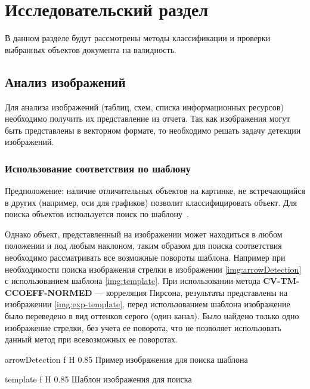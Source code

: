 \chapter{Исследовательский раздел}
В данном разделе будут рассмотрены методы классификации и проверки выбранных объектов документа на валидность.

\section{Анализ изображений}
Для анализа изображений (таблиц, схем, списка информационных ресурсов) необходимо получить их представление из отчета. Так как изображения могут быть представлены
в векторном формате, то необходимо решать задачу детекции изображений. 	



\subsection{Использование соответствия по шаблону}
Предположение: наличие отличительных объектов на картинке, не встречающийся в других (например, оси для графиков) позволит классифицировать объект.
Для поиска объектов используется поиск по шаблону~\cite{pattern_matching}.

Однако объект, представленный на изображении может находиться в любом положении и под любым наклоном, таким образом для поиска соответствия необходимо 
рассматривать все возможные повороты шаблона. Например при необходимости поиска изображения стрелки в изображении \ref{img:arrowDetection} с использованием шаблона \ref{img:template}. При использовании метода \textbf{CV-TM-CCOEFF-NORMED} — корреляция Пирсона, результаты представлены на изображении \ref{img:exp-template}, перед использованием шаблона изображение было переведено в вид оттенков серого (один канал).
Было найдено только одно изображение стрелки, без учета ее поворота, что не позволяет использовать данный метод при всевозможных ее поворотах.

{arrowDetection} %
{f} %
{H} %
{0.85\textwidth} %
{Пример изображения для поиска шаблона} %


{template} %
{f} %
{H} %
{0.85\textwidth} %
{Шаблон изображения для поиска} %



